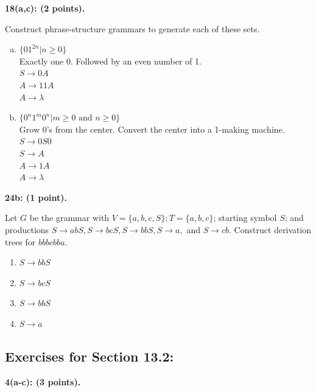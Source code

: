 \documentclass[12pt]{article}  %
\begin{document}
\noindent
{\bf 18(a,c): (2 points).}

\noindent
Construct phrase-structure grammars to generate each of these sets.
\begin{enumerate}[a)]
    \item $\{01^{2n}\vert n\geq0\}$\\
    Exactly one 0. Followed by an even number of 1.\\
    $S\to0A$\\
    $A\to11A$\\
    $A\to\lambda$
    
    \setcounter{enumi}{2}
    \item $\{0^n1^m0^n\vert m\geq0\textrm{ and }n\geq0\}$\\
    Grow 0's from the center. Convert the center into a 1-making machine.\\
    $S\to0S0$\\
    $S\to A$\\
    $A\to1A$\\
    $A\to\lambda$
\end{enumerate}

\clearpage
\noindent
{\bf 24b: (1 point).}

\noindent
Let $G$ be the grammar with $V=\{a,b,c,S\};T=\{a, b, c\}$; starting symbol $S$; and productions $S\to abS, S\to bcS,S\to bbS,S\to a,$ and $S\to cb$. Construct derivation trees for $bbbcbba$.
\begin{enumerate}
    \item $S\to bbS$
    \item $S\to bcS$
    \item $S\to bbS$
    \item $S\to a$
\end{enumerate}

\clearpage
\subsection*{Exercises for Section 13.2:}     

\noindent
{\bf 4(a-c): (3 points).}
\end{document}
